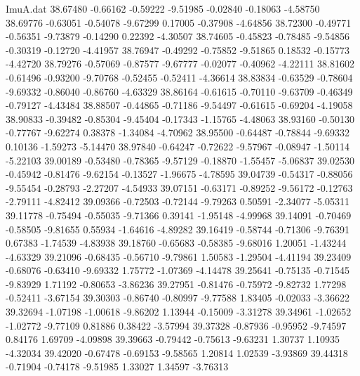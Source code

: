 \begin{filecontents}{ImuA.dat}
  38.67480   -0.66162   -0.59222   -9.51985   -0.02840   -0.18063   -4.58750
  38.69776   -0.63051   -0.54078   -9.67299    0.17005   -0.37908   -4.64856
  38.72300   -0.49771   -0.56351   -9.73879   -0.14290    0.22392   -4.30507
  38.74605   -0.45823   -0.78485   -9.54856   -0.30319   -0.12720   -4.41957
  38.76947   -0.49292   -0.75852   -9.51865    0.18532   -0.15773   -4.42720
  38.79276   -0.57069   -0.87577   -9.67777   -0.02077   -0.40962   -4.22111
  38.81602   -0.61496   -0.93200   -9.70768   -0.52455   -0.52411   -4.36614
  38.83834   -0.63529   -0.78604   -9.69332   -0.86040   -0.86760   -4.63329
  38.86164   -0.61615   -0.70110   -9.63709   -0.46349   -0.79127   -4.43484
  38.88507   -0.44865   -0.71186   -9.54497   -0.61615   -0.69204   -4.19058
  38.90833   -0.39482   -0.85304   -9.45404   -0.17343   -1.15765   -4.48063
  38.93160   -0.50130   -0.77767   -9.62274    0.38378   -1.34084   -4.70962
  38.95500   -0.64487   -0.78844   -9.69332    0.10136   -1.59273   -5.14470
  38.97840   -0.64247   -0.72622   -9.57967   -0.08947   -1.50114   -5.22103
  39.00189   -0.53480   -0.78365   -9.57129   -0.18870   -1.55457   -5.06837
  39.02530   -0.45942   -0.81476   -9.62154   -0.13527   -1.96675   -4.78595
  39.04739   -0.54317   -0.88056   -9.55454   -0.28793   -2.27207   -4.54933
  39.07151   -0.63171   -0.89252   -9.56172   -0.12763   -2.79111   -4.82412
  39.09366   -0.72503   -0.72144   -9.79263    0.50591   -2.34077   -5.05311
  39.11778   -0.75494   -0.55035   -9.71366    0.39141   -1.95148   -4.99968
  39.14091   -0.70469   -0.58505   -9.81655    0.55934   -1.64616   -4.89282
  39.16419   -0.58744   -0.71306   -9.76391    0.67383   -1.74539   -4.83938
  39.18760   -0.65683   -0.58385   -9.68016    1.20051   -1.43244   -4.63329
  39.21096   -0.68435   -0.56710   -9.79861    1.50583   -1.29504   -4.41194
  39.23409   -0.68076   -0.63410   -9.69332    1.75772   -1.07369   -4.14478
  39.25641   -0.75135   -0.71545   -9.83929    1.71192   -0.80653   -3.86236
  39.27951   -0.81476   -0.75972   -9.82732    1.77298   -0.52411   -3.67154
  39.30303   -0.86740   -0.80997   -9.77588    1.83405   -0.02033   -3.36622
  39.32694   -1.07198   -1.00618   -9.86202    1.13944   -0.15009   -3.31278
  39.34961   -1.02652   -1.02772   -9.77109    0.81886    0.38422   -3.57994
  39.37328   -0.87936   -0.95952   -9.74597    0.84176    1.69709   -4.09898
  39.39663   -0.79442   -0.75613   -9.63231    1.30737    1.10935   -4.32034
  39.42020   -0.67478   -0.69153   -9.58565    1.20814    1.02539   -3.93869
  39.44318   -0.71904   -0.74178   -9.51985    1.33027    1.34597   -3.76313

\end{filecontents}

